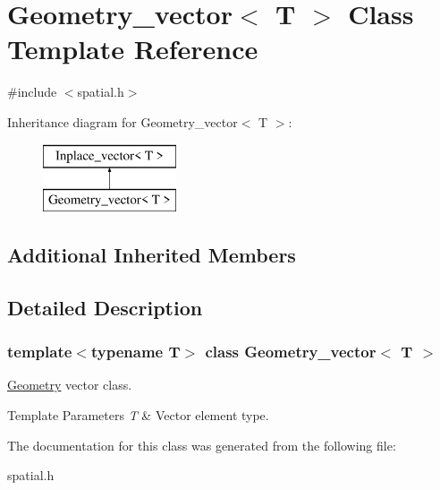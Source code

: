 \hypertarget{classGeometry__vector}{}\section{Geometry\+\_\+vector$<$ T $>$ Class Template Reference}
\label{classGeometry__vector}


{\ttfamily \#include $<$spatial.\+h$>$}

Inheritance diagram for Geometry\+\_\+vector$<$ T $>$\+:\begin{figure}[H]
\begin{center}
\leavevmode
\includegraphics[height=2.000000cm]{classGeometry__vector}
\end{center}
\end{figure}
\subsection*{Additional Inherited Members}


\subsection{Detailed Description}
\subsubsection*{template$<$typename T$>$\newline
class Geometry\+\_\+vector$<$ T $>$}

\mbox{\hyperlink{classGeometry}{Geometry}} vector class. 
\begin{DoxyTemplParams}{Template Parameters}
{\em T} & Vector element type. \\
\hline
\end{DoxyTemplParams}


The documentation for this class was generated from the following file\+:\begin{DoxyCompactItemize}
\item 
spatial.\+h\end{DoxyCompactItemize}
